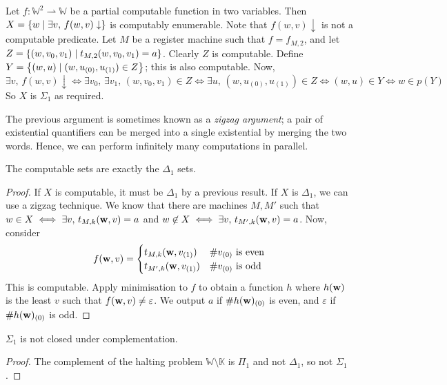 \begin{example}
	Let \( f \colon \mathbb W^2 \rightharpoonup \mathbb W \) be a partial computable function in two variables.
	Then \( X = \qty{w \mid \exists v,\, f(w, v) \downarrow} \) is computably enumerable.
	Note that \( f(w, v) \downarrow \) is not a computable predicate.
	Let \( M \) be a register machine such that \( f = f_{M,2} \), and let \( Z = \qty{(w, v_0, v_1) \mid t_{M,2}(w,v_0,v_1) = a} \).
	Clearly \( Z \) is computable.
	Define \( Y = \qty{(w, u) \mid (w, u_{(0)}, u_{(1)}) \in Z} \); this is also computable.
	Now,
	\[ \exists v,\, f(w,v) \downarrow \iff \exists v_0,\, \exists v_1,\, (w,v_0,v_1) \in Z \iff \exists u,\, (w,u_{(0)},u_{(1)}) \in Z \iff (w,u) \in Y \iff w \in p(Y) \]
	So \( X \) is \( \Sigma_1 \) as required.
\end{example}
\begin{remark}
	The previous argument is sometimes known as a \emph{zigzag argument}; a pair of existential quantifiers can be merged into a single existential by merging the two words.
	Hence, we can perform infinitely many computations in parallel.
\end{remark}
\begin{corollary}
	The computable sets are exactly the \( \Delta_1 \) sets.
\end{corollary}
\begin{proof}
	If \( X \) is computable, it must be \( \Delta_1 \) by a previous result.
	If \( X \) is \( \Delta_1 \), we can use a zigzag technique.
	We know that there are machines \( M, M' \) such that \( w \in X \iff \exists v,\, t_{M,k}(\vb w, v) = a \) and \( w \not\in X \iff \exists v,\, t_{M',k}(\vb w, v) = a \).
	Now, consider
	\[ f(\vb w, v) = \begin{cases}
		t_{M,k}(\vb w, v_{(1)}) & \#v_{(0)} \text{ is even} \\
		t_{M',k}(\vb w, v_{(1)}) & \#v_{(0)} \text{ is odd}
	\end{cases} \]
	This is computable.
	Apply minimisation to \( f \) to obtain a function \( h \) where \( h(\vb w) \) is the least \( v \) such that \( f(\vb w, v) \neq \varepsilon \).
	We output \( a \) if \( \#h(\vb w)_{(0)} \) is even, and \( \varepsilon \) if \( \#h(\vb w)_{(0)} \) is odd.
\end{proof}
\begin{corollary}
	\( \Sigma_1 \) is not closed under complementation.
\end{corollary}
\begin{proof}
	The complement of the halting problem \( \mathbb W \setminus \mathbb K \) is \( \Pi_1 \) and not \( \Delta_1 \), so not \( \Sigma_1 \).
\end{proof}
